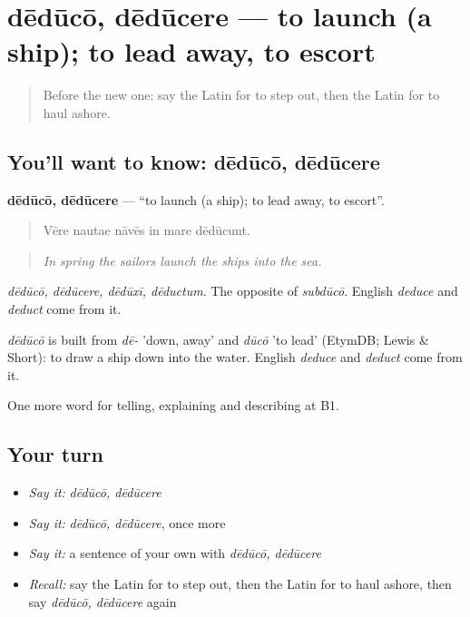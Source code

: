 \section[dēdūcō, dēdūcere]{dēdūcō, dēdūcere — to launch (a ship); to lead away, to escort}

\label{lesson:LA-C439-deduco}



\begin{quote}
Before the new one: say the Latin for to step out, then the Latin for to haul ashore.
\end{quote}

\subsection*{You'll want to know: dēdūcō, dēdūcere}
\textbf{dēdūcō, dēdūcere} — \textquotedblleft{}to launch (a ship); to lead away, to escort\textquotedblright{}.

\begin{quote}
Vēre nautae nāvēs in mare dēdūcunt.
\end{quote}

\begin{quote}
\emph{In spring the sailors launch the ships into the sea.}
\end{quote}

\emph{dēdūcō, dēdūcere, dēdūxī, dēductum}. The opposite of \emph{subdūcō}. English \emph{deduce} and \emph{deduct} come from it.

\begin{cousinweb}
\emph{dēdūcō} is built from \emph{dē-} 'down, away' and \emph{dūcō} 'to lead' (EtymDB; Lewis \& Short): to draw a ship down into the water. English \emph{deduce} and \emph{deduct} come from it.
\end{cousinweb}

\begin{grammarlens}[title={What you've built}]
One more word for telling, explaining and describing at B1.
\end{grammarlens}

\subsection*{Your turn}
\begin{itemize}
\raggedright
  \item \emph{Say it:} \emph{dēdūcō, dēdūcere}
  \item \emph{Say it:} \emph{dēdūcō, dēdūcere}, once more
  \item \emph{Say it:} a sentence of your own with \emph{dēdūcō, dēdūcere}
  \item \emph{Recall:} say the Latin for to step out, then the Latin for to haul ashore, then say \emph{dēdūcō, dēdūcere} again
\end{itemize}

